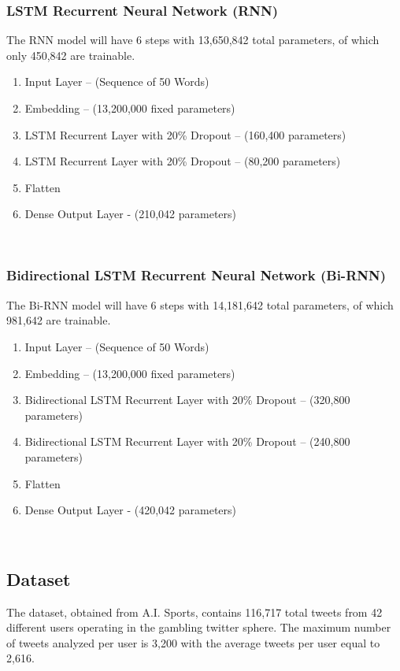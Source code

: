 \documentclass[5p,authoryear]{elsarticle}
\begin{document}
\subsubsection{LSTM Recurrent Neural Network (RNN)}\label{rnn}

The RNN model will have 6 steps with 13,650,842 total parameters, of which only 450,842 are trainable.

\begin{enumerate}
 \item Input Layer – (Sequence of 50 Words)
 \item Embedding – (13,200,000 fixed parameters)
 \item LSTM Recurrent Layer with 20\% Dropout – (160,400 parameters)
 \item LSTM Recurrent Layer with 20\% Dropout – (80,200 parameters)
 \item Flatten
 \item Dense Output Layer - (210,042 parameters)
\end{enumerate} \\

\subsubsection{Bidirectional LSTM Recurrent Neural Network (Bi-RNN)}\label{brnn}

The Bi-RNN model will have 6 steps with 14,181,642 total parameters, of which 981,642 are trainable.

\begin{enumerate}
 \item Input Layer – (Sequence of 50 Words)
 \item Embedding – (13,200,000 fixed parameters)
 \item Bidirectional LSTM Recurrent Layer with 20\% Dropout – (320,800 parameters)
 \item Bidirectional LSTM Recurrent Layer with 20\% Dropout – (240,800 parameters)
 \item Flatten
 \item Dense Output Layer - (420,042 parameters)
\end{enumerate} \\



\subsection{Dataset}

The dataset, obtained from A.I. Sports, contains 116,717 total tweets from 42 different users operating in the gambling twitter sphere. The maximum number of tweets analyzed per user is 3,200 with the average tweets per user equal to 2,616. 
\end{document}
